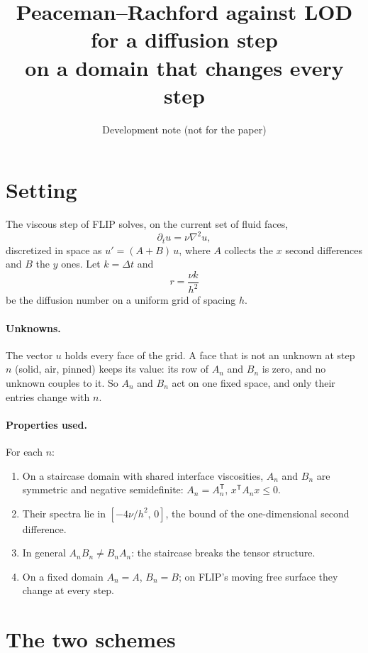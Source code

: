 \documentclass[11pt]{article}
\title{Peaceman--Rachford against LOD for a diffusion step\\on a domain that changes every step}
\author{Development note (not for the paper)}
\date{}
\theoremstyle{remark}
\begin{document}
\maketitle

\section{Setting}

The viscous step of FLIP solves, on the current set of fluid faces,
\begin{equation}
  \partial_t u = \nu \nabla^2 u ,
\end{equation}
discretized in space as $u' = (A + B)\,u$, where $A$ collects the $x$ second differences and $B$ the $y$ ones. Let $k = \Delta t$ and
\begin{equation}
  r = \frac{\nu k}{h^2}
\end{equation}
be the diffusion number on a uniform grid of spacing $h$.

\paragraph{Unknowns.} The vector $u$ holds every face of the grid. A face that is not an unknown at step $n$ (solid, air, pinned) keeps its value: its row of $A_n$ and $B_n$ is zero, and no unknown couples to it. So $A_n$ and $B_n$ act on one fixed space, and only their entries change with $n$.

\paragraph{Properties used.} For each $n$:
\begin{enumerate}
  \item[(P1)] On a staircase domain with shared interface viscosities, $A_n$ and $B_n$ are symmetric and negative semidefinite: $A_n = A_n^{\mathsf T}$, $x^{\mathsf T} A_n x \le 0$.
  \item[(P2)] Their spectra lie in $[-4\nu/h^2,\,0]$, the bound of the one-dimensional second difference.
  \item[(P3)] In general $A_n B_n \ne B_n A_n$: the staircase breaks the tensor structure.
  \item[(P4)] On a fixed domain $A_n = A$, $B_n = B$; on FLIP's moving free surface they change at every step.
\end{enumerate}

\section{The two schemes}
\end{document}
